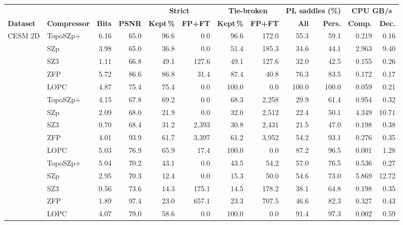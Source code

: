 \begin{tabular}{@{}llrrrrrrrrrr@{}}
\toprule
 & & & & \multicolumn{2}{c}{\textbf{Strict}} & \multicolumn{2}{c}{\textbf{Tie-broken}} & \multicolumn{2}{c}{\textbf{PL saddles (\%)}} & \multicolumn{2}{c}{\textbf{CPU GB/s}} \\
\cmidrule(lr){5-6}\cmidrule(lr){7-8}\cmidrule(lr){9-10}\cmidrule(lr){11-12}
\textbf{Dataset} & \textbf{Compressor} & \textbf{Bits} & \textbf{PSNR} & \textbf{Kept\,\%} & \textbf{FP+FT} & \textbf{Kept\,\%} & \textbf{FP+FT} & \textbf{All} & \textbf{Pers.} & \textbf{Comp.} & \textbf{Dec.} \\
\midrule
\multirow{5}{*}{CESM 2D} & TopoSZp+ & 6.16 & 65.0 & 96.6 & 0.0 & 96.6 & 172.0 & 55.3 & 59.1 & 0.219 & 0.16 \\
 & SZp & 3.98 & 65.0 & 36.8 & 0.0 & 51.4 & 185.3 & 34.6 & 44.1 & 2.963 & 9.40 \\
 & SZ3 & 1.11 & 66.8 & 49.1 & 127.6 & 49.1 & 127.6 & 32.0 & 42.5 & 0.155 & 0.26 \\
 & ZFP & 5.72 & 86.6 & 86.8 & 31.4 & 87.4 & 40.8 & 76.3 & 83.5 & 0.172 & 0.17 \\
 & LOPC & 4.87 & 75.4 & 75.4 & 0.0 & 100.0 & 0.0 & 100.0 & 100.0 & 0.059 & 0.21 \\
\addlinespace[2pt]
\multirow{5}{*}{CESM 3D} & TopoSZp+ & 4.15 & 67.8 & 69.2 & 0.0 & 68.3 & 2{,}258 & 29.9 & 61.4 & 0.954 & 0.32 \\
 & SZp & 2.09 & 68.0 & 21.9 & 0.0 & 32.0 & 2{,}512 & 22.4 & 50.1 & 4.349 & 10.71 \\
 & SZ3 & 0.70 & 68.4 & 31.2 & 2{,}393 & 30.8 & 2{,}431 & 21.5 & 47.0 & 0.198 & 0.38 \\
 & ZFP & 4.01 & 93.9 & 61.7 & 3{,}397 & 61.2 & 3{,}952 & 54.2 & 93.1 & 0.276 & 0.35 \\
 & LOPC & 5.03 & 76.9 & 65.9 & 17.4 & 100.0 & 0.0 & 87.2 & 96.5 & 0.001 & 1.28 \\
\addlinespace[2pt]
\multirow{5}{*}{Hurricane} & TopoSZp+ & 5.04 & 70.2 & 43.1 & 0.0 & 43.5 & 54.2 & 57.0 & 76.5 & 0.536 & 0.27 \\
 & SZp & 2.95 & 70.3 & 12.4 & 0.0 & 15.3 & 50.0 & 54.6 & 73.0 & 5.869 & 12.72 \\
 & SZ3 & 0.56 & 73.6 & 14.3 & 175.1 & 14.5 & 178.2 & 38.1 & 64.8 & 0.198 & 0.35 \\
 & ZFP & 1.89 & 97.4 & 23.0 & 657.1 & 23.3 & 707.5 & 46.6 & 82.3 & 0.327 & 0.43 \\
 & LOPC & 4.07 & 79.0 & 58.6 & 0.0 & 100.0 & 0.0 & 91.4 & 97.3 & 0.002 & 0.59 \\

\end{tabular}
